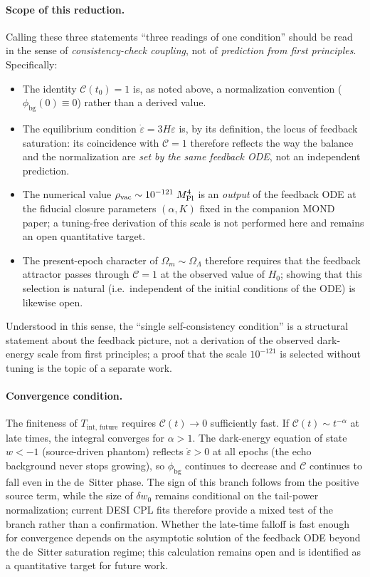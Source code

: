 \documentclass[11pt]{article}
\begin{document}
\paragraph{Scope of this reduction.}
Calling these three statements ``three readings of one condition''
should be read in the sense of \emph{consistency-check coupling}, not
of \emph{prediction from first principles}.  Specifically:
\begin{itemize}
\item The identity $\mathcal{C}(t_0)=1$ is, as noted above,
  a normalization convention ($\phi_{\mathrm{bg}}(0)\equiv 0$) rather
  than a derived value.
\item The equilibrium condition $\dot\varepsilon=3H\varepsilon$ is,
  by its definition, the locus of feedback saturation: its
  coincidence with $\mathcal{C}=1$ therefore reflects the way the
  balance and the normalization are \emph{set by the same feedback
  ODE}, not an independent prediction.
\item The numerical value $\rho_{\mathrm{vac}}\sim 10^{-121}\;M_{\rm
  Pl}^{4}$ is an \emph{output} of the feedback ODE at the fiducial
  closure parameters $(\alpha,K)$ fixed in the companion MOND paper;
  a tuning-free derivation of this scale is not performed here and
  remains an open quantitative target.
\item The present-epoch character of $\Omega_m\sim\Omega_\Lambda$
  therefore requires that the feedback attractor passes through
  $\mathcal{C}=1$ at the observed value of $H_0$; showing that this
  selection is natural (i.e.\ independent of the initial conditions
  of the ODE) is likewise open.
\end{itemize}
Understood in this sense, the ``single self-consistency condition''
is a structural statement about the feedback picture, not a
derivation of the observed dark-energy scale from first principles;
a proof that the scale $10^{-121}$ is selected without tuning is the
topic of a separate work.

\paragraph{Convergence condition.}
The finiteness of $T_{\mathrm{int,\,future}}$ requires
$\mathcal{C}(t)\to 0$ sufficiently fast.  If $\mathcal{C}(t)\sim
t^{-\alpha}$ at late times, the integral converges for $\alpha>1$.
The dark-energy equation of state $w<-1$ (source-driven phantom)
reflects $\dot\varepsilon>0$ at all epochs (the echo background never
stops growing), so $\phi_{\mathrm{bg}}$ continues to decrease and
$\mathcal{C}$ continues to fall even in the de~Sitter phase.  The
sign of this branch follows from the positive source term, while
the size of $\delta w_0$ remains conditional on the tail-power
normalization; current DESI CPL fits therefore provide a mixed
test of the branch rather than a confirmation.  Whether
the late-time falloff is fast enough for convergence depends on the
asymptotic solution of the feedback ODE beyond the de~Sitter
saturation regime; this calculation remains open and is identified
as a quantitative target for future work.
\end{document}
